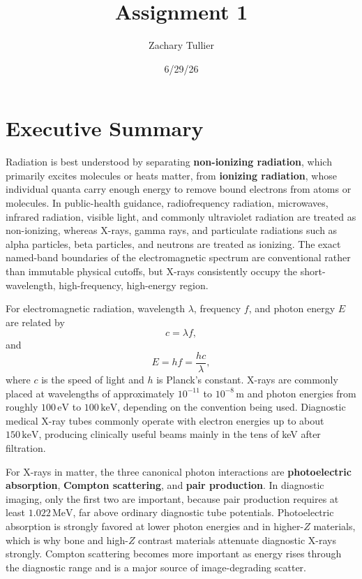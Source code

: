 \documentclass[12pt]{article}
\title{Assignment 1}
\author{Zachary Tullier}
\date{6/29/26}
\begin{document}
\maketitle

\section*{Executive Summary}

Radiation is best understood by separating \textbf{non-ionizing radiation}, which primarily excites molecules or heats matter, from \textbf{ionizing radiation}, whose individual quanta carry enough energy to remove bound electrons from atoms or molecules. In public-health guidance, radiofrequency radiation, microwaves, infrared radiation, visible light, and commonly ultraviolet radiation are treated as non-ionizing, whereas X-rays, gamma rays, and particulate radiations such as alpha particles, beta particles, and neutrons are treated as ionizing. The exact named-band boundaries of the electromagnetic spectrum are conventional rather than immutable physical cutoffs, but X-rays consistently occupy the short-wavelength, high-frequency, high-energy region.

For electromagnetic radiation, wavelength $\lambda$, frequency $f$, and photon energy $E$ are related by
\begin{equation}
    c = \lambda f,
\end{equation}
and
\begin{equation}
    E = hf = \frac{hc}{\lambda},
\end{equation}
where $c$ is the speed of light and $h$ is Planck's constant. X-rays are commonly placed at wavelengths of approximately $10^{-11}$ to $10^{-8}\,\mathrm{m}$ and photon energies from roughly $100\,\mathrm{eV}$ to $100\,\mathrm{keV}$, depending on the convention being used. Diagnostic medical X-ray tubes commonly operate with electron energies up to about $150\,\mathrm{keV}$, producing clinically useful beams mainly in the tens of keV after filtration.

For X-rays in matter, the three canonical photon interactions are \textbf{photoelectric absorption}, \textbf{Compton scattering}, and \textbf{pair production}. In diagnostic imaging, only the first two are important, because pair production requires at least $1.022\,\mathrm{MeV}$, far above ordinary diagnostic tube potentials. Photoelectric absorption is strongly favored at lower photon energies and in higher-$Z$ materials, which is why bone and high-$Z$ contrast materials attenuate diagnostic X-rays strongly. Compton scattering becomes more important as energy rises through the diagnostic range and is a major source of image-degrading scatter.
\end{document}
